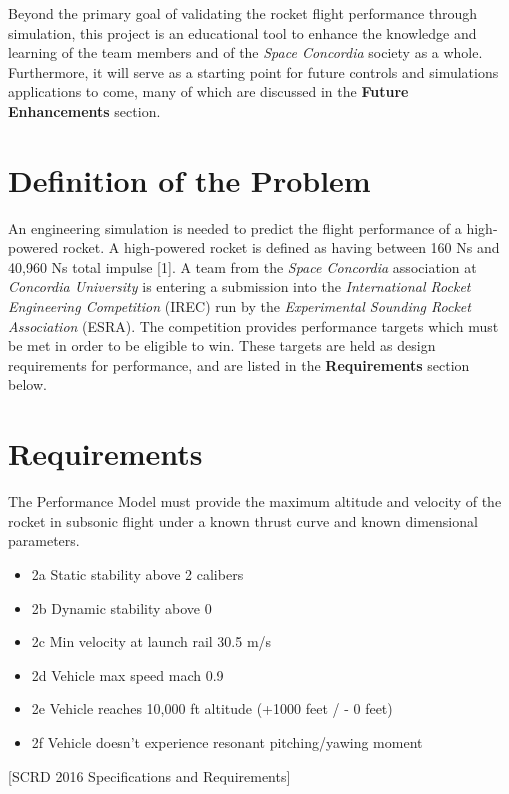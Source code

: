 \documentclass[]{book}
\providecommand{\tightlist}{%
  \setlength{\itemsep}{0pt}\setlength{\parskip}{0pt}}
\begin{document}
Beyond the primary goal of validating the rocket flight performance
through simulation, this project is an educational tool to enhance the
knowledge and learning of the team members and of the \emph{Space
Concordia} society as a whole. Furthermore, it will serve as a starting
point for future controls and simulations applications to come, many of
which are discussed in the \textbf{Future Enhancements} section.

\section{Definition of the Problem}\label{definition-of-the-problem}

An engineering simulation is needed to predict the flight performance of
a high-powered rocket. A high-powered rocket is defined as having
between 160 Ns and 40,960 Ns total impulse {[}1{]}. A team from the
\emph{Space Concordia} association at \emph{Concordia University} is
entering a submission into the \emph{International Rocket Engineering
Competition} (IREC) run by the \emph{Experimental Sounding Rocket
Association} (ESRA). The competition provides performance targets which
must be met in order to be eligible to win. These targets are held as
design requirements for performance, and are listed in the
\textbf{Requirements} section below.

\section{Requirements}\label{requirements}

The Performance Model must provide the maximum altitude and velocity of
the rocket in subsonic flight under a known thrust curve and known
dimensional parameters.

\begin{itemize}
\tightlist
\item
  2a Static stability above 2 calibers
\item
  2b Dynamic stability above 0
\item
  2c Min velocity at launch rail 30.5 m/s
\item
  2d Vehicle max speed mach 0.9
\item
  2e Vehicle reaches 10,000 ft altitude (+1000 feet / - 0 feet)
\item
  2f Vehicle doesn't experience resonant pitching/yawing moment
\end{itemize}

{[}SCRD 2016 Specifications and Requirements{]}
\end{document}
